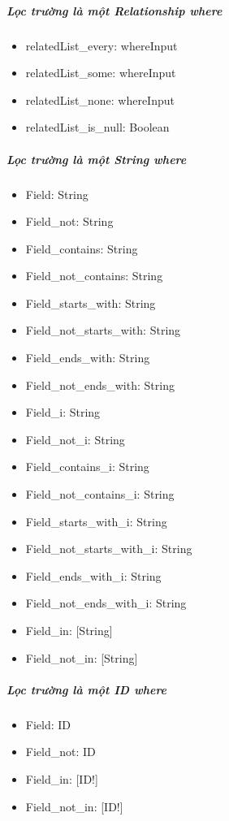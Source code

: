 \subparagraph{Lọc trường là một Relationship {where}}
\begin{itemize}
	\item {relatedList\_every}: whereInput
	\item {relatedList\_some}: whereInput
	\item {relatedList\_none}: whereInput
	\item {relatedList\_is\_null}: Boolean
\end{itemize}
\subparagraph{Lọc trường là một String \emph{where}}
\begin{itemize}
	\item {Field:} String
	\item {Field\_not}: String
	\item {Field\_contains}: String
	\item {Field\_not\_contains}: String
	\item {Field\_starts\_with}: String
	\item {Field\_not\_starts\_with}: String
	\item {Field\_ends\_with}: String
	\item {Field\_not\_ends\_with}: String
	\item {Field\_i}: String
	\item {Field\_not\_i}: String
	\item {Field\_contains\_i}: String
	\item {Field\_not\_contains\_i}: String
	\item {Field\_starts\_with\_i}: String
	\item {Field\_not\_starts\_with\_i}: String
	\item {Field\_ends\_with\_i}: String
	\item {Field\_not\_ends\_with\_i}: String
	\item {Field\_in}: [String]
	\item {Field\_not\_in}: [String]
\end{itemize}

\subparagraph{Lọc trường là một ID \emph{where}}
\begin{itemize}
	\item {Field}: ID
	\item {Field\_not}: ID
	\item {Field\_in}: [ID!]
	\item {Field\_not\_in}: [ID!]
\end{itemize}


